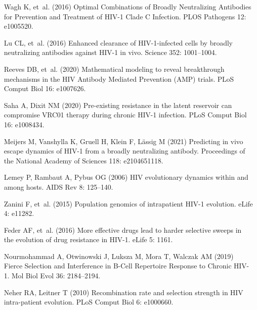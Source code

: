 \documentclass[aps,prx,noshowpacs,twocolumn,nofootinbib]{revtex4-2}
\begin{document}
\begin{thebibliography}{10}
Wagh K, et~al. (2016) Optimal {{Combinations}} of {{Broadly Neutralizing
  Antibodies}} for {{Prevention}} and {{Treatment}} of {{HIV}}-1 {{Clade C
  Infection}}.
\newblock PLOS Pathogens 12: e1005520.

Lu CL, et~al. (2016) {Enhanced clearance of HIV-1-infected cells by broadly
  neutralizing antibodies against HIV-1 in vivo.}
\newblock Science 352: 1001--1004.

Reeves DB, et~al. (2020) {Mathematical modeling to reveal breakthrough
  mechanisms in the HIV Antibody Mediated Prevention (AMP) trials.}
\newblock PLoS Comput Biol 16: e1007626.

Saha A, Dixit NM (2020) {Pre-existing resistance in the latent reservoir can
  compromise VRC01 therapy during chronic HIV-1 infection.}
\newblock PLoS Comput Biol 16: e1008434.

Meijers M, Vanshylla K, Gruell H, Klein F, L{\"a}ssig M (2021) Predicting in
  vivo escape dynamics of {{HIV}}-1 from a broadly neutralizing antibody.
\newblock Proceedings of the National Academy of Sciences 118: e2104651118.

Lemey P, Rambaut A, Pybus OG (2006) {HIV evolutionary dynamics within and among
  hosts}.
\newblock AIDS Rev 8: 125--140.

Zanini F, et~al. (2015) {Population genomics of intrapatient HIV-1 evolution.}
\newblock eLife 4: e11282.

Feder AF, et~al. (2016) {More effective drugs lead to harder selective sweeps
  in the evolution of drug resistance in HIV-1.}
\newblock eLife 5: 1161.

Nourmohammad A, Otwinowski J, Luksza M, Mora T, Walczak AM (2019) {Fierce
  Selection and Interference in B-Cell Repertoire Response to Chronic HIV-1.}
\newblock Mol Biol Evol 36: 2184--2194.

Neher RA, Leitner T (2010) {Recombination rate and selection strength in HIV
  intra-patient evolution}.
\newblock PLoS Comput Biol 6: e1000660.


\end{thebibliography}
\end{document}
